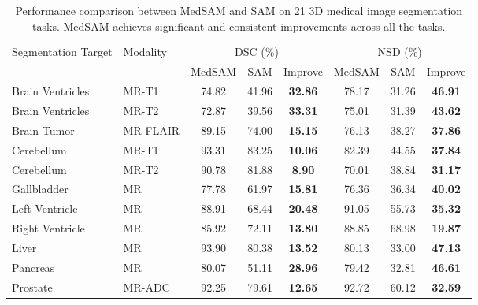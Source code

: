 \documentclass[runningheads]{llncs}
\begin{document}
\begin{table}[]
\caption{Performance comparison between MedSAM and SAM on 21 3D medical image segmentation tasks. MedSAM achieves significant and consistent improvements across all the tasks.}\label{tab:3d}
\centering
\begin{tabular}{llccc|ccc}
\hline
\multirow{2}{*}{Segmentation Target} & \multirow{2}{*}{Modality} & \multicolumn{3}{c|}{DSC (\%)}              & \multicolumn{3}{c}{NSD (\%)}              \\ \cline{3-8} 
                                     &                           & MedSAM  & SAM     & Improve     & MedSAM  & SAM     & Improve     \\ \hline
Brain Ventricles                     & MR-T1                     & 74.82 & 41.96 & \textbf{32.86} & 78.17 & 31.26 & \textbf{46.91} \\
Brain Ventricles                     & MR-T2                     & 72.87 & 39.56 & \textbf{33.31} & 75.01 & 31.39 & \textbf{43.62} \\
Brain Tumor                          & MR-FLAIR                  & 89.15 & 74.00 & \textbf{15.15} & 76.13 & 38.27 & \textbf{37.86} \\
Cerebellum                           & MR-T1                     & 93.31 & 83.25 & \textbf{10.06} & 82.39 & 44.55 & \textbf{37.84} \\
Cerebellum                           & MR-T2                     & 90.78 & 81.88 & \textbf{8.90}  & 70.01 & 38.84 & \textbf{31.17} \\
Gallbladder                          & MR                        & 77.78 & 61.97 & \textbf{15.81} & 76.36 & 36.34 & \textbf{40.02} \\
Left Ventricle                 & MR                        & 88.91 & 68.44 & \textbf{20.48} & 91.05 & 55.73 & \textbf{35.32} \\
Right Ventricle                & MR                        & 85.92 & 72.11 & \textbf{13.80} & 88.85 & 68.98 & \textbf{19.87} \\
Liver                                & MR                        & 93.90 & 80.38 & \textbf{13.52} & 80.13 & 33.00 & \textbf{47.13} \\
Pancreas                             & MR                        & 80.07 & 51.11 & \textbf{28.96} & 79.42 & 32.81 & \textbf{46.61} \\
Prostate                             & MR-ADC                    & 92.25 & 79.61 & \textbf{12.65} & 92.72 & 60.12 & \textbf{32.59} \\

\end{tabular}
\end{table}
\end{document}
